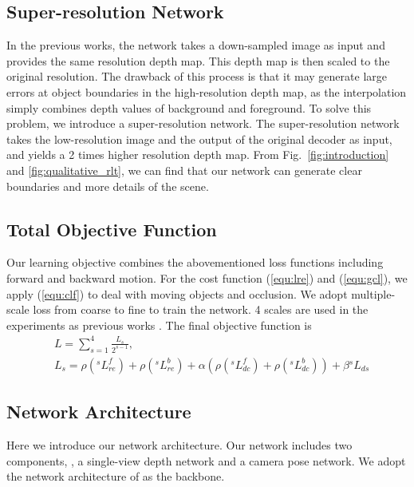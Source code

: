\documentclass[10pt,twocolumn,letterpaper]{article}
\begin{document}
\subsection{Super-resolution Network}

In the previous works, the network takes a down-sampled image as input and provides the same resolution depth map. This depth map is then scaled to the original resolution. The drawback of this process is that it may generate large errors at object boundaries in the high-resolution depth map, as the interpolation simply combines depth values of background and foreground. To solve this problem, we introduce a super-resolution network. The super-resolution network takes the low-resolution image and the output of the original decoder as input, and yields a 2 times higher resolution depth map. From Fig.~\ref{fig:introduction} and \ref{fig:qualitative_rlt}, we can find that our network can generate clear boundaries and more details of the scene.

\subsection{Total Objective Function }
Our learning objective combines the abovementioned loss functions including forward and backward motion. For the cost function (\ref{equ:lre}) and (\ref{equ:gcl}), we apply (\ref{equ:clf}) to deal with moving objects and occlusion. We adopt multiple-scale loss from coarse to fine to train the network. 4 scales are used in the experiments as previous works \cite{zhou2017unsupervised,godard2017unsupervised}. The final objective function is
\begin{align} \label{equ:objective}
&L = \sum\limits_{s = 1}^4 {\frac{{{L_s}}}{{{2^{s - 1}}}}} ,\\
&{L_s} = \rho ({}^sL_{re}^f) + \rho ({}^sL_{re}^b) + \alpha (\rho ({}^sL_{dc}^f) + \rho ({}^sL_{dc}^b)) + \beta {}^s{L_{ds}} \nonumber
\end{align}


\subsection{Network Architecture}
Here we introduce our network architecture. Our network includes two components, \ie, a single-view depth network and a camera pose network. We adopt the network architecture of \cite{zhou2017unsupervised} as the backbone. 
\end{document}
